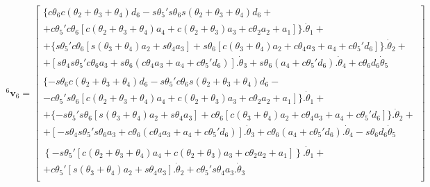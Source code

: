 \begin{equation}
    \label{eq:6v6}
\begin{gathered}
    ^6\textbf{v}_6 = \begin{bmatrix}
        \{c\theta_6c(\theta_2 + \theta_3 + \theta_4)d_6 - s\theta_5's\theta_6s(\theta_2 + \theta_3 + \theta_4)d_6 + \\
        +c\theta_5'c\theta_6[c(\theta_2 + \theta_3 + \theta_4)a_4 + c(\theta_2 + \theta_3)a_3 + c\theta_2a_2 + a_1]\}.\dot{\theta}_1 + \\
        +\{s\theta_5'c\theta_6[s(\theta_3+\theta_4)a_2 + s\theta_4a_3] + s\theta_6[c(\theta_3+\theta_4)a_2 + c\theta_4a_3 + a_4 + c\theta_5'd_6]\}.\dot{\theta}_2 + \\
        +[s\theta_4s\theta_5'c\theta_6a_3 + s\theta_6(c\theta_4a_3 + a_4 + c\theta_5'd_6)].\dot{\theta}_3 + s\theta_6(a_4 + c\theta_5'd_6).\dot{\theta}_4 + c\theta_6d_6\dot{\theta}_5 \\ 
        \\
        \{-s\theta_6c(\theta_2 + \theta_3 + \theta_4)d_6 - s\theta_5'c\theta_6s(\theta_2 + \theta_3 + \theta_4)d_6 - \\
        -c\theta_5's\theta_6[c(\theta_2 + \theta_3 + \theta_4)a_4 + c(\theta_2 + \theta_3)a_3 + c\theta_2a_2 + a_1]\}.\dot{\theta}_1 + \\
        +\{-s\theta_5's\theta_6[s(\theta_3+\theta_4)a_2 + s\theta_4a_3] + c\theta_6[c(\theta_3+\theta_4)a_2 + c\theta_4a_3 + a_4 + c\theta_5'd_6]\}.\dot{\theta}_2 + \\
        +[-s\theta_4s\theta_5's\theta_6a_3 + c\theta_6(c\theta_4a_3 + a_4 + c\theta_5'd_6)].\dot{\theta}_3 + c\theta_6(a_4 + c\theta_5'd_6).\dot{\theta}_4 - s\theta_6d_6\dot{\theta}_5 \\ 
        \\
        \left\{-s\theta_5'[c(\theta_2 + \theta_3 + \theta_4)a_4 + c(\theta_2 + \theta_3)a_3 + c\theta_2a_2 + a_1]\right\}.\dot{\theta}_1 + \\
        + c\theta_5'[s(\theta_3+\theta_4)a_2 + s\theta_4a_3].\dot{\theta}_2 + c\theta_5's\theta_4a_3.\dot{\theta}_3 \\ 
    \end{bmatrix}
\end{gathered}
\end{equation}

